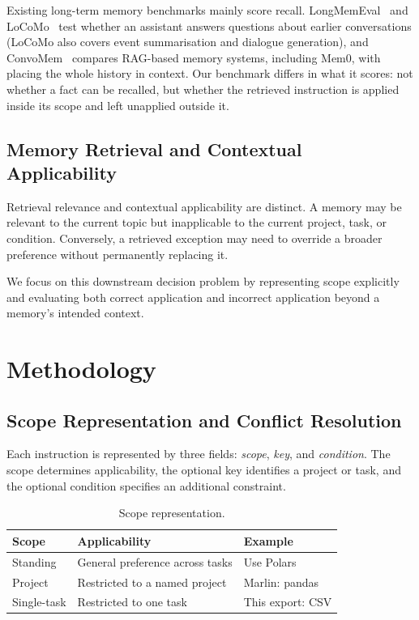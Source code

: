 \documentclass[11pt,a4paper]{article}
\begin{document}
Existing long-term memory benchmarks mainly score recall.
LongMemEval~\cite{wu2025longmemeval} and
LoCoMo~\cite{maharana2024locomo} test whether an assistant
answers questions about earlier conversations (LoCoMo also
covers event summarisation and dialogue generation), and
ConvoMem~\cite{pakhomov2025convomem} compares RAG-based memory
systems, including Mem0, with placing the whole history in
context. Our benchmark differs
in what it scores: not whether a fact can be recalled, but
whether the retrieved instruction is applied inside its scope
and left unapplied outside it.

\subsection{Memory Retrieval and Contextual Applicability}

Retrieval relevance and contextual applicability are distinct.
A memory may be relevant to the current topic but inapplicable
to the current project, task, or condition. Conversely, a
retrieved exception may need to override a broader preference
without permanently replacing it.

We focus on this downstream decision problem by representing
scope explicitly and evaluating both correct application and
incorrect application beyond a memory's intended context.

\section{Methodology}
\label{sec:methodology}

\subsection{Scope Representation and Conflict Resolution}
\label{sec:scope-representation}

Each instruction is represented by three fields:
\emph{scope}, \emph{key}, and \emph{condition}.
The scope determines applicability, the optional key identifies
a project or task, and the optional condition specifies an
additional constraint.

\begin{table}[htbp]
\centering
\small
\caption{Scope representation.}
\label{tab:scopes}
\begin{tabularx}{\linewidth}{lXl}
\toprule
Scope & Applicability & Example \\
\midrule
Standing & General preference across tasks &
Use Polars \\
Project & Restricted to a named project &
Marlin: pandas \\
Single-task & Restricted to one task &
This export: CSV \\
\bottomrule
\end{tabularx}
\end{table}
\end{document}

